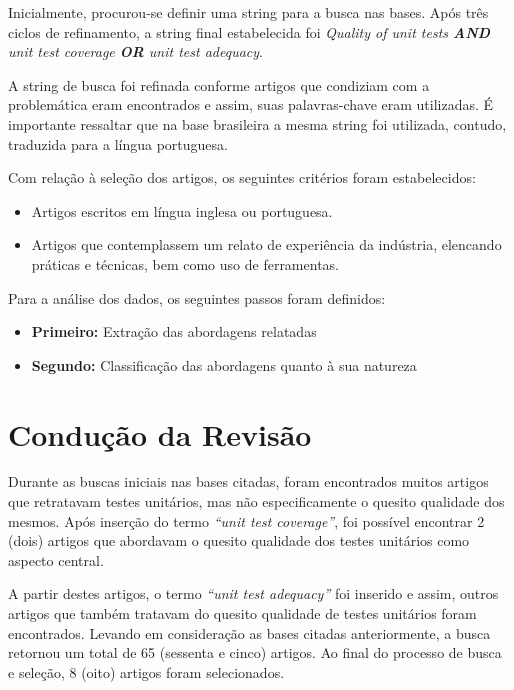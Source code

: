 \begin{anexosenv}
Inicialmente, procurou-se definir uma string para a busca nas bases. Após três ciclos de refinamento, a string final estabelecida foi \textit{Quality of unit tests \textbf{AND} unit test coverage \textbf{OR} unit test adequacy}.

A string de busca foi refinada conforme artigos que condiziam com a problemática eram encontrados e assim, suas palavras-chave eram utilizadas. É importante ressaltar que na base brasileira a mesma string foi utilizada, contudo, traduzida para a língua portuguesa.

Com relação à seleção dos artigos, os seguintes critérios foram estabelecidos:

\begin{itemize}
	\item Artigos escritos em língua inglesa ou portuguesa.
	\item Artigos que contemplassem um relato de experiência da indústria, elencando práticas e técnicas, bem como uso de ferramentas.
\end{itemize}

Para a análise dos dados, os seguintes passos foram definidos:

\begin{itemize}
	\item \textbf{Primeiro:} Extração das abordagens relatadas
	\item \textbf{Segundo:} Classificação das abordagens quanto à sua natureza
\end{itemize}

\section{Condução da Revisão}

Durante as buscas iniciais nas bases citadas, foram encontrados muitos artigos que
retratavam testes unitários, mas não especificamente o quesito qualidade dos mesmos. Após
inserção do termo \textit{“unit test coverage”}, foi possível encontrar 2 (dois) artigos que
abordavam o quesito qualidade dos testes unitários como aspecto central.

A partir destes artigos, o termo \textit{“unit test adequacy”} foi inserido e assim, outros
artigos que também tratavam do quesito qualidade de testes unitários foram encontrados.
Levando em consideração as bases citadas anteriormente, a busca retornou um total de 65
(sessenta e cinco) artigos. Ao final do processo de busca e seleção, 8 (oito) artigos foram
selecionados.

\end{anexosenv}